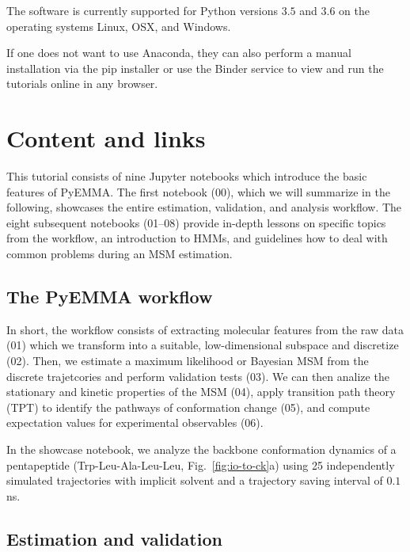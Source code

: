 \documentclass[9pt,tutorial]{livecoms}
\begin{document}
The software is currently supported for Python versions $3.5$ and $3.6$ on the operating systems Linux, OSX, and Windows.

If one does not want to use Anaconda, they can also perform a manual installation via the pip installer or use the Binder service to view and run the tutorials online in any browser.

\section{Content and links}

This tutorial consists of nine Jupyter notebooks which introduce the basic features of PyEMMA. The first notebook (00), which we will summarize in the following, showcases the entire estimation, validation, and analysis workflow. The eight subsequent notebooks (01--08) provide in-depth lessons on specific topics from the workflow, an introduction to HMMs, and guidelines how to deal with common problems during an MSM estimation.

\subsection{The PyEMMA workflow}

In short, the workflow consists of extracting molecular features from the raw data (01) which we transform into a suitable, low-dimensional subspace and discretize (02). Then, we estimate a maximum likelihood or Bayesian MSM from the discrete trajetcories and perform validation tests (03). We can then analize the stationary and kinetic properties of the MSM (04), apply transition path theory (TPT) to identify the pathways of conformation change (05), and compute expectation values for experimental observables (06).

In the showcase notebook, we analyze the backbone conformation dynamics of a pentapeptide (Trp-Leu-Ala-Leu-Leu, Fig.~\ref{fig:io-to-ck}a) using 25 independently simulated trajectories with implicit solvent and a trajectory saving interval of $0.1$ ns.~\cite{pyemma}

\subsection{Estimation and validation}
\end{document}
